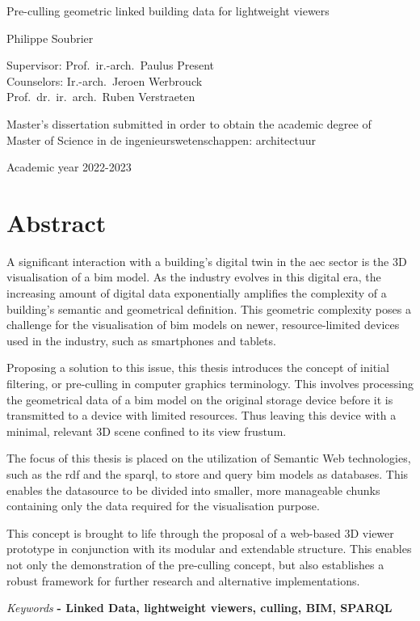 \begin{center}
    \sffamily
    \huge Pre-culling geometric linked building data
    for lightweight viewers

    \Large Philippe Soubrier

    \normalsize
    Supervisor: Prof.\ ir.-arch.\ Paulus Present         \\
    Counselors: Ir.-arch.\ Jeroen Werbrouck \\
    Prof.\ dr.\ ir.\ arch.\ Ruben Verstraeten
\end{center}

Master’s dissertation submitted in order to obtain the academic degree of \\
Master of Science in de ingenieurswetenschappen: architectuur

Academic year 2022-2023
\section*{\LARGE Abstract}
A significant interaction with a building's digital twin in the \ac{aec} sector is the 3D visualisation of a \ac{bim} model. As the industry evolves in this digital era, the increasing amount of digital data exponentially amplifies the complexity of a building's semantic and geometrical definition. This geometric complexity poses a challenge for the visualisation of \ac{bim} models on newer, resource-limited devices used in the industry, such as smartphones and tablets.

Proposing a solution to this issue, this thesis introduces the concept of initial filtering, or pre-culling in computer graphics terminology. This involves processing the geometrical data of a \ac{bim} model on the original storage device before it is transmitted to a device with limited resources. Thus leaving this device with a minimal, relevant 3D scene confined to its view frustum.

The focus of this thesis is placed on the utilization of Semantic Web technologies, such as the \ac{rdf} and the \ac{sparql}, to store and query \ac{bim} models as databases. This enables the datasource to be divided into smaller, more manageable chunks containing only the data required for the visualisation purpose.

This concept is brought to life through the proposal of a web-based 3D viewer prototype in conjunction with its modular and extendable structure. This enables not only the demonstration of the pre-culling concept, but also establishes a robust framework for further research and alternative implementations.
                   
\vfill
\emph{Keywords} \textbf{
    - Linked Data, lightweight viewers, culling, BIM, SPARQL
} 